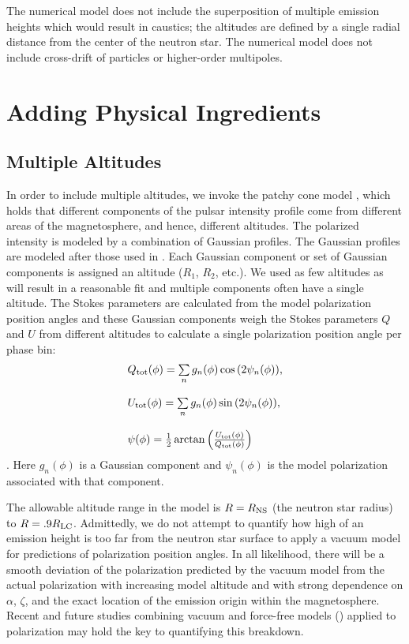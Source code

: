 The numerical model does not include the superposition of multiple emission heights which
would result in caustics; the altitudes are defined by a single radial distance from the center
of the neutron star.
The numerical model does not include cross-drift of particles
or higher-order multipoles.

\section{Adding Physical Ingredients}
\label{sec:adding}
\subsection{Multiple Altitudes}
\label{sec:MASE}
In order to include multiple altitudes, 
we invoke the patchy cone model \citep{lyne1988shape,karastergiou2007empirical},
which holds that different components of the pulsar intensity profile come from
different areas of the magnetosphere, and hence, different altitudes.
The polarized intensity is modeled by a combination of Gaussian profiles.
The Gaussian profiles are modeled after those used in \cite{karastergiou2009complex}. 
Each Gaussian component or set of Gaussian components is assigned an altitude
($R_1$, $R_2$, etc.).  We used as few altitudes as will result in a reasonable
fit and multiple components often have a single altitude.  
The Stokes parameters are calculated from the model polarization position angles
and these Gaussian 
components weigh the Stokes parameters $Q$ and $U$ from different
altitudes to calculate a single polarization position angle per phase bin:
\begin{equation}\label{eq:stokes}
\begin{array}{l}
Q_{\rm{tot}}(\phi)=\sum\limits_{n} g_{n}(\phi) \cos{(2\psi_{n}(\phi))},\\\\
U_{\rm{tot}}(\phi)=\sum\limits_{n} g_{n}(\phi) \sin{(2\psi_{n}(\phi))},\\\\
\psi(\phi)=\frac{1}{2}\arctan\left(\frac{U_{\rm{tot}}(\phi)}{Q_{\rm{tot}}(\phi)}\right)
\end{array}
\end{equation} \citep{karastergiou2009complex}.
Here $g_{n}(\phi)$ is a Gaussian component and $\psi_{n}(\phi)$ is the model polarization
associated with that component.

The allowable altitude range in the model is $R=R_{\rm{NS}}$ 
(the neutron star radius) to $R=.9R_{\rm{LC}}$.
Admittedly, we do not attempt to quantify how high of an emission height is 
too far from the neutron star surface to apply a vacuum model for predictions of polarization position angles. 
In all likelihood, there will be a smooth deviation of
the polarization predicted
by the vacuum model 
from the actual polarization
with increasing model altitude and with strong dependence on
$\alpha$, $\zeta$, and the exact location of the emission origin within the magnetosphere. 
Recent and future studies combining vacuum and force-free models (\citealp{kalapotharakos2012gamma})
applied to polarization may hold the key to quantifying this breakdown.


